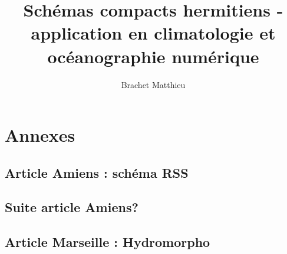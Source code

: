\documentclass[10pt,a4paper]{book}
\author{Brachet Matthieu}
\title{Schémas compacts hermitiens - application en climatologie et océanographie numérique}
\begin{document}
\maketitle
\newpage
\tableofcontents
\listoffigures

%






\chapter{Annexes}
\section{Article Amiens : schéma RSS}
\section{Suite article Amiens?}
\section{Article Marseille : Hydromorpho}
%



\end{document}
